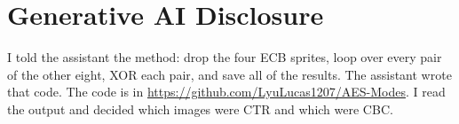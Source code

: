 \documentclass[12pt]{article}
\begin{document}
\section*{Generative AI Disclosure}

I told the assistant the method: drop the four ECB sprites, loop over every pair of the other eight, XOR each pair, and save all of the results. The assistant wrote that code. The code is in \url{https://github.com/LyuLucas1207/AES-Modes}. I read the output and decided which images were CTR and which were CBC.
\end{document}
